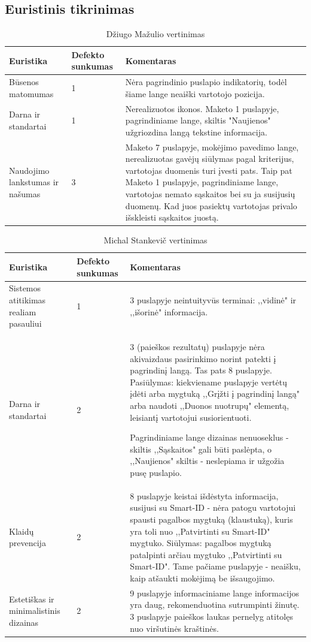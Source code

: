 \documentclass[oneside]{VUMIFPSkursinis}
\begin{document}
\subsection{Euristinis tikrinimas}
\begin{center}
\begin{longtable}[!htb]{|p{3.5cm}|p{1.9cm}|p{9.6cm}|}
	\caption{Džiugo Mažulio vertinimas}
	\endfirsthead
	\endhead
  \hline
	Euristika & Defekto sunkumas & Komentaras \\ \hline
	Būsenos matomumas & 1 & Nėra pagrindinio puslapio indikatorių, todėl šiame lange neaiški vartotojo pozicija. \\ \hline
	Darna ir standartai & 1 & Nerealizuotos ikonos. Maketo 1 puslapyje, pagrindiniame lange, skiltis "Naujienos" užgriozdina langą tekstine informacija. \\ \hline
	Naudojimo lankstumas ir našumas & 3 & Maketo 7 puslapyje, mokėjimo pavedimo lange, nerealizuotas gavėjų siūlymas pagal kriterijus, vartotojas duomenis turi įvesti pats. Taip pat Maketo 1 puslapyje, pagrindiniame lange, vartotojas nemato sąskaitos bei su ja susijusių duomenų. Kad juos pasiektų vartotojas privalo išskleisti sąskaitos juostą. \\ \hline
\end{longtable}

\begin{longtable}[!htb]{|p{3.5cm}|p{1.9cm}|p{9.6cm}|}
	\caption{Michal Stankevič vertinimas}
	\endfirsthead
	\endhead
  \hline
	Euristika & Defekto sunkumas & Komentaras \\ \hline
	Sistemos atitikimas realiam pasauliui & 1 & 3 puslapyje neintuityvūs terminai: ,,vidinė" ir ,,išorinė" informacija. \\ \hline
	Darna ir standartai & 2 & 3 (paieškos rezultatų) puslapyje nėra akivaizdaus pasirinkimo norint patekti į pagrindinį langą. Tas pats 8 puslapyje. Pasiūlymas: kiekviename puslapyje vertėtų įdėti arba mygtuką ,,Grįžti į pagrindinį langą" arba naudoti ,,Duonos nuotrupų" elementą, leisiantį vartotojui susiorientuoti. \par
	Pagrindiniame lange dizainas nenuoseklus - skiltis ,,Sąskaitos" gali būti paslėpta, o ,,Naujienos" skiltis - neslepiama ir užgožia pusę puslapio. \\ \hline
	Klaidų prevencija & 2 & 8 puslapyje keistai išdėstyta informacija, susijusi su Smart-ID - nėra patogu vartotojui spausti pagalbos mygtuką (klaustuką), kuris yra toli nuo ,,Patvirtinti su Smart-ID" mygtuko. Siūlymas: pagalbos mygtuką patalpinti arčiau mygtuko ,,Patvirtinti su Smart-ID". Tame pačiame puslapyje - neaišku, kaip atšaukti mokėjimą be išsaugojimo.\\ \hline
	Estetiškas ir minimalistinis dizainas & 2 & 9 puslapyje informaciniame lange informacijos yra daug, rekomenduotina sutrumpinti žinutę. 3 puslapyje paieškos laukas pernelyg atitolęs nuo viršutinės kraštinės. \\ \hline
\end{longtable}
\end{center}
\end{document}
